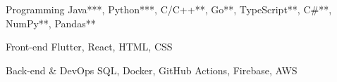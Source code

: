 

\begin{cvskills}

  \cvskill
    {Programming} %
    {Java***, Python***, C/C++**, Go**, TypeScript**, C\#**, NumPy**, Pandas**} %

  \cvskill
    {Front-end} %
    {Flutter, React, HTML, CSS} %

  \cvskill
    {Back-end \& DevOps} %
    {SQL, Docker, GitHub Actions, Firebase, AWS} %



    
\end{cvskills}
